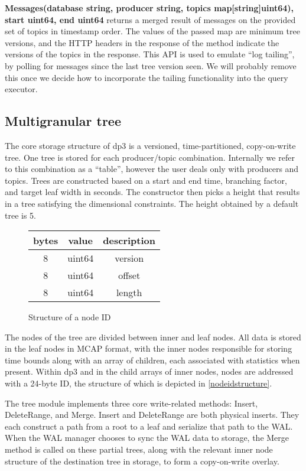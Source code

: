 \documentclass[9pt,twocolumn]{article}
\newcommand{\q}[1]{``#1''}
\begin{document}
    \textbf{Messages(database string, producer string, topics
    map[string]uint64), start uint64, end uint64} returns a merged result of
    messages on the provided set of topics in timestamp order. The values of
    the passed map are minimum tree versions, and the HTTP headers in the
    response of the method indicate the versions of the topics in the response.
    This API is used to emulate \q{log tailing}, by polling for messages since
    the last tree version seen. We will probably remove this once we decide how
    to incorporate the tailing functionality into the query executor.

    \subsection{Multigranular tree}
    The core storage structure of dp3 is a versioned, time-partitioned,
    copy-on-write tree. One tree is stored for each producer/topic combination.
    Internally we refer to this combination as a \q{table}, however the user deals
    only with producers and topics. Trees are constructed based on a start and end
    time, branching factor, and target leaf width in seconds. The constructor then
    picks a height that results in a tree satisfying the dimensional constraints.
    The height obtained by a default tree is 5.

    \begin{figure}
      \begin{tabular}{ |c|c|c| }
        \hline
        bytes & value & description \\
        \hline
        8 & uint64 & version \\
        8 & uint64 & offset \\
        8 & uint64 & length \\
        \hline
      \end{tabular}
      \caption{Structure of a node ID}
      \label{nodeidstructure}
    \end{figure}

    The nodes of the tree are divided between inner and leaf nodes. All data is
    stored in the leaf nodes in MCAP format, with the inner nodes responsible for
    storing time bounds along with an array of children, each associated with
    statistics when present. Within dp3 and in the child arrays of inner nodes,
    nodes are addressed with a 24-byte ID, the structure of which is depicted in
    \autoref{nodeidstructure}.

    The tree module implements three core write-related methods: Insert,
    DeleteRange, and Merge. Insert and DeleteRange are both physical inserts. They
    each construct a path from a root to a leaf and serialize that path to the WAL.
    When the WAL manager chooses to sync the WAL data to storage, the Merge method
    is called on these partial trees, along with the relevant inner node structure
    of the destination tree in storage, to form a copy-on-write overlay.
\end{document}
